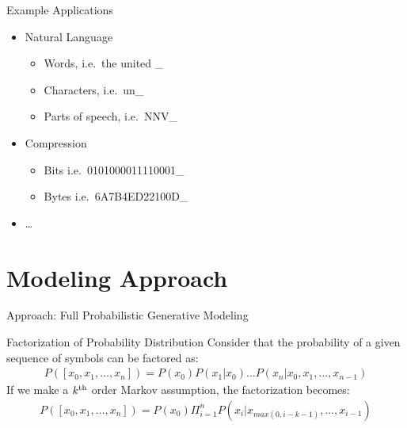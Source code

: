 \documentclass{beamer}
\begin{document}
\begin{frame}[t]{Example Applications}
	\begin{itemize}
		\item{Natural Language}
		\begin{itemize}
			\item Words, i.e.~the united \_
			\item Characters, i.e.~un\_
			\item Parts of speech, i.e.~NNV\_
		\end{itemize}

		\vspace{.75cm}		
		
		\item{Compression}
		\begin{itemize}
			\item  Bits i.e.~0101000011110001\_
			\item  Bytes i.e.~6A7B4ED22100D\_
		\end{itemize}
		
		\item \ldots
	\end{itemize}
	
\end{frame}

\section{Modeling Approach}

\begin{frame}[t]{Approach: Full Probabilistic Generative Modeling}

	\begin{block}{Factorization of Probability Distribution}
		Consider that the probability of a given sequence of symbols can be factored as:
		\begin{eqnarray*}
			P([x_0, x_1, \ldots, x_n]) = P(x_0)P(x_1 | x_0) \ldots P(x_n | x_0, x_1, \ldots, x_{n-1})
		\end{eqnarray*}
		If we make a $k^{\rm th}$ order Markov assumption, the factorization becomes:
		\begin{eqnarray*}
			P([x_0, x_1, \ldots, x_n]) = P(x_0) \Pi_{i = 1}^n P(x_i | x_{max(0, i-k-1)}, \ldots, x_{i-1})
		\end{eqnarray*}
	\end{block}
\end{frame}
\end{document}
